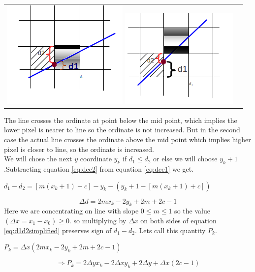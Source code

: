 \documentclass[a4paper,12pt,oneside]{book}
\begin{document}
\begin{tabular}{l l}	
		\includegraphics[scale=1]{Files/Images/DeeOne.png}	
		\includegraphics[scale=1.0]{Files/Images/DeeTwo.png}	\\
\end{tabular}
 
 The line crosses the ordinate at point below the mid point, which implies the lower pixel is nearer to line so the ordinate is not increased. But in the second case the actual line crosses the ordinate above the mid point which implies higher pixel is closer to line, so the ordinate is increased.\\
		
 
We will chose the next $y$ coordinate $y_k$ if $d_1 \leq d_2$ or else we will choose $y_k+1$.Subtracting equation \ref{eq:dee2} from equation \ref{eq:dee1} we get.
\begin{center}
	$d_1-d_2=[m(x_k+1)+c]-y_k-(y_k+1-[m(x_k+1)+c])$
\end{center}
\begin{equation} \label{eq:d1d2simplified}
	\Delta d=2mx_k-2y_k+2m+2c-1
\end{equation}
Here we are concentrating on line with slope $0\leq m \leq1$ so the value $(\Delta x = x_1-x_0)\geq 0$. so multiplying by $\Delta x$ on both sides of equation \ref{eq:d1d2simplified} preserves sign of $d_1-d_2$. Lets call this quantity $P_k$.
\begin{center}
	$P_k= \Delta x(2mx_k-2y_k+2m+2c-1)$
\end{center}
\begin{equation} \label{eq:simplifiedpk}
	\Rightarrow P_k=2\Delta yx_k-2\Delta xy_k+2\Delta y+\Delta x(2c-1)
\end{equation}
\end{document}
